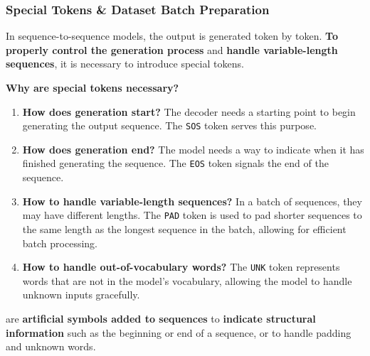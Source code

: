 \subsubsection{Special Tokens \& Dataset Batch Preparation}

In sequence-to-sequence models, the output is generated token by token. \textbf{To properly control the generation process} and \textbf{handle variable-length sequences}, it is necessary to introduce special tokens.

\highspace
\begin{flushleft}
    \textcolor{Green3}{ \textbf{Why are special tokens necessary?}}
\end{flushleft}
\begin{enumerate}
    \item \textbf{How does generation start?} The decoder needs a starting point to begin generating the output sequence. The \texttt{SOS} token serves this purpose.
    \item \textbf{How does generation end?} The model needs a way to indicate when it has finished generating the sequence. The \texttt{EOS} token signals the end of the sequence.
    \item \textbf{How to handle variable-length sequences?} In a batch of sequences, they may have different lengths. The \texttt{PAD} token is used to pad shorter sequences to the same length as the longest sequence in the batch, allowing for efficient batch processing.
    \item \textbf{How to handle out-of-vocabulary words?} The \texttt{UNK} token represents words that are not in the model's vocabulary, allowing the model to handle unknown inputs gracefully.
\end{enumerate}

\highspace
\begin{definitionbox}
     are \textbf{artificial symbols added to sequences} to \textbf{indicate structural information} such as the beginning or end of a sequence, or to handle padding and unknown words.
\end{definitionbox}

